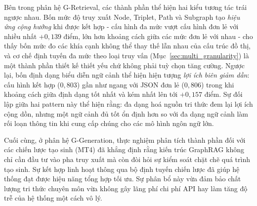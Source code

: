 Bên trong phân hệ G-Retrieval, các thành phần thể hiện hai kiểu tương tác trái ngược nhau. Bốn mức độ truy xuất Node, Triplet, Path và Subgraph tạo \textit{hiệu ứng cộng hưởng} khi được kết hợp - cấu hình đa mức vượt cấu hình đơn lẻ với nhiều nhất $+0,139$ điểm, lớn hơn khoảng cách giữa các mức đơn lẻ với nhau - cho thấy bốn mức đo các khía cạnh không thể thay thế lẫn nhau của cấu trúc đồ thị, và cơ chế định tuyến đa mức theo loại truy vấn (Mục~\ref{sec:multi_granularity}) là một thành phần thiết kế thiết yếu chứ không phải tuỳ chọn tăng cường. Ngược lại, bốn định dạng biểu diễn ngữ cảnh thể hiện hiện tượng \textit{lợi ích biên giảm dần}: cấu hình kết hợp ($0,803$) gần như ngang với JSON đơn lẻ ($0,806$) trong khi khoảng cách giữa định dạng tốt nhất và kém nhất lên tới $+0,157$ điểm. Sự đối lập giữa hai pattern này thể hiện rằng: đa dạng hoá nguồn tri thức đem lại lợi ích cộng dồn, nhưng một ngữ cảnh đủ tốt ổn định hơn so với đa dạng ngữ cảnh làm rối loạn thông tin khi cung cấp chúng cho các mô hình ngôn ngữ lớn.

Cuối cùng, ở phân hệ G-Generation, thực nghiệm phân tích thành phần đối với các chiến lược tạo sinh (MT4) đã khẳng định rằng kiến trúc GraphRAG không chỉ cần đầu tư vào pha truy xuất mà còn đòi hỏi sự kiểm soát chặt chẽ quá trình tạo sinh. Sự kết hợp linh hoạt thông qua bộ định tuyến chiến lược đã giúp hệ thống đạt được hiệu năng tổng hợp tối ưu. Sự phân bổ này vừa đảm bảo chất lượng tri thức chuyên môn vừa không gây lãng phí chi phí API hay làm tăng độ trễ của hệ thống một cách vô lý.